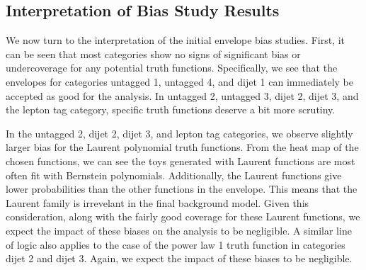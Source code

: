 
\subsection{Interpretation of Bias Study Results}
We now turn to the interpretation of the initial envelope bias studies. First, it can be seen that most 
categories show no signs of significant bias or undercoverage for any potential truth functions. 
Specifically, we see that the envelopes for categories untagged 1, untagged 4, and dijet 1
can immediately be accepted as good for the analysis. In untagged 2, untagged 3, dijet 2, dijet 3, and the lepton 
tag category, specific truth functions deserve a bit more scrutiny. 

In the untagged 2, dijet 2, dijet 3, and lepton tag categories, we observe slightly larger bias for the Laurent polynomial truth functions. 
From the heat map of the chosen functions, we can see the toys generated with Laurent functions are most often fit with 
Bernstein polynomials. Additionally, the Laurent functions give lower probabilities than the other functions in the envelope. 
This means that the Laurent family is irrevelant in the final background model. 
Given this consideration, along with the fairly good coverage for these 
Laurent functions, we expect the impact of these biases on the analysis to be negligible. A similar line of logic also applies to the 
case of the power law 1 truth function in categories dijet 2 and dijet 3. Again, we expect the impact of these biases to be negligible.

